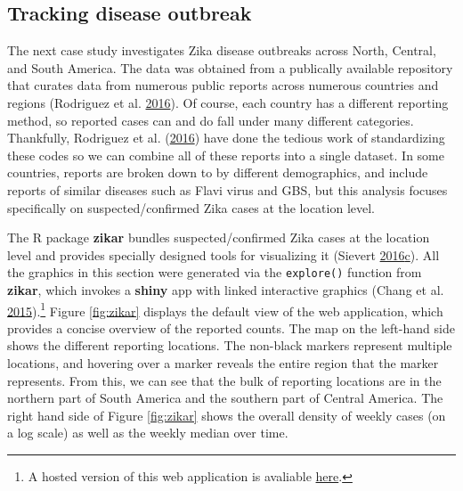\documentclass[12pt,]{isuthesis}
\let\rmarkdownfootnote\footnote%
\def\footnote{\protect\rmarkdownfootnote}
\begin{document}
\hypertarget{tracking-disease-outbreak}{\subsection{Tracking disease
outbreak}\label{tracking-disease-outbreak}}

The next case study investigates Zika disease outbreaks across North,
Central, and South America. The data was obtained from a publically
available repository that curates data from numerous public reports
across numerous countries and regions (Rodriguez et al.
\protect\hyperlink{ref-zika-data}{2016}). Of course, each country has a
different reporting method, so reported cases can and do fall under many
different categories. Thankfully, Rodriguez et al.
(\protect\hyperlink{ref-zika-data}{2016}) have done the tedious work of
standardizing these codes so we can combine all of these reports into a
single dataset. In some countries, reports are broken down to by
different demographics, and include reports of similar diseases such as
Flavi virus and GBS, but this analysis focuses specifically on
suspected/confirmed Zika cases at the location level.

The R package \textbf{zikar} bundles suspected/confirmed Zika cases at
the location level and provides specially designed tools for visualizing
it (Sievert
\protect\hyperlink{ref-zikar}{2016}\protect\hyperlink{ref-zikar}{c}).
All the graphics in this section were generated via the
\texttt{explore()} function from \textbf{zikar}, which invokes a
\textbf{shiny} app with linked interactive graphics (Chang et al.
\protect\hyperlink{ref-shiny}{2015}).\footnote{A hosted version of this
  web application is avaliable
  \href{http://104.131.111.111:3838/zikar/}{here}.} Figure
\ref{fig:zikar} displays the default view of the web application, which
provides a concise overview of the reported counts. The map on the
left-hand side shows the different reporting locations. The non-black
markers represent multiple locations, and hovering over a marker reveals
the entire region that the marker represents. From this, we can see that
the bulk of reporting locations are in the northern part of South
America and the southern part of Central America. The right hand side of
Figure \ref{fig:zikar} shows the overall density of weekly cases (on a
log scale) as well as the weekly median over time.
\end{document}

